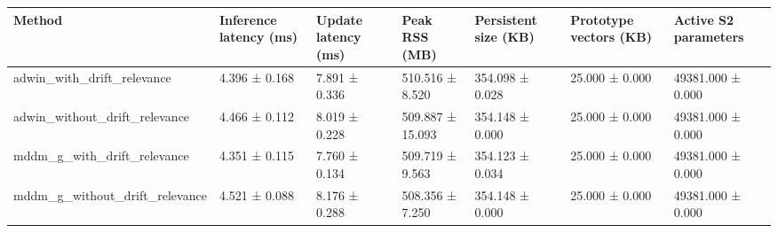 \begin{tabular}{lllllll}
\toprule
Method & Inference latency (ms) & Update latency (ms) & Peak RSS (MB) & Persistent size (KB) & Prototype vectors (KB) & Active S2 parameters \\
\midrule
adwin\_with\_drift\_relevance & 4.396 ± 0.168 & 7.891 ± 0.336 & 510.516 ± 8.520 & 354.098 ± 0.028 & 25.000 ± 0.000 & 49381.000 ± 0.000 \\
adwin\_without\_drift\_relevance & 4.466 ± 0.112 & 8.019 ± 0.228 & 509.887 ± 15.093 & 354.148 ± 0.000 & 25.000 ± 0.000 & 49381.000 ± 0.000 \\
mddm\_g\_with\_drift\_relevance & 4.351 ± 0.115 & 7.760 ± 0.134 & 509.719 ± 9.563 & 354.123 ± 0.034 & 25.000 ± 0.000 & 49381.000 ± 0.000 \\
mddm\_g\_without\_drift\_relevance & 4.521 ± 0.088 & 8.176 ± 0.288 & 508.356 ± 7.250 & 354.148 ± 0.000 & 25.000 ± 0.000 & 49381.000 ± 0.000 \\
\bottomrule
\end{tabular}
